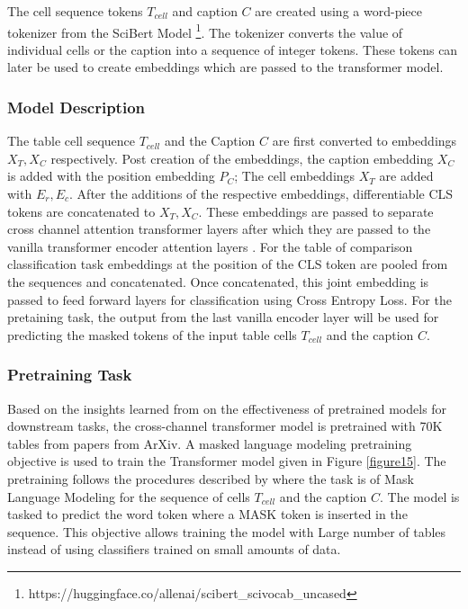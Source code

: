 The cell sequence tokens $T_{cell}$ and caption $C$ are created using a word-piece tokenizer from the SciBert Model \footnote{https://huggingface.co/allenai/scibert\_scivocab\_uncased}. The tokenizer converts the value of individual cells or the caption into a sequence of integer tokens. These tokens can later be used to create embeddings which are passed to the  transformer model. 

\subsubsection{Model Description}
The table cell sequence $T_{cell}$ and the Caption $C$ are first converted to embeddings $X_T, X_C$ respectively. Post creation of the embeddings,  the caption embedding  $X_C$ is added with the position embedding $P_C$; The cell embeddings $X_T$ are added with $E_r,E_c$. After the additions of the respective embeddings, differentiable CLS tokens are concatenated to $X_T,X_C$.
These embeddings are passed to separate cross channel attention transformer layers \parencite{tsai2019multimodal} after which they are passed to the vanilla transformer encoder attention layers \parencite{vaswani2017attention}. For the table of comparison classification task embeddings at the position of the CLS token are pooled from the sequences and concatenated. Once concatenated, this joint embedding is passed to feed forward layers for classification using Cross Entropy Loss. For the pretaining task, the output from the last vanilla encoder layer will be used for predicting the masked tokens of the input table cells $T_{cell}$ and the caption $C$.


\subsubsection{Pretraining Task}
Based on the insights learned from \cite{hernandez2021scaling} on the effectiveness of pretrained models for downstream tasks, the cross-channel transformer model is pretrained with 70K tables from papers from ArXiv. A masked language modeling pretraining objective is used to train the Transformer model given in Figure \ref{figure15}. The pretraining follows the procedures described by \cite{deng2020turl} where the task is of Mask Language Modeling for the sequence of cells $T_{cell}$ and the caption $C$. The model is tasked to predict the word token where a MASK token is inserted in the sequence.  This objective allows training the model with Large number of tables instead of using classifiers trained on small amounts of data. 

